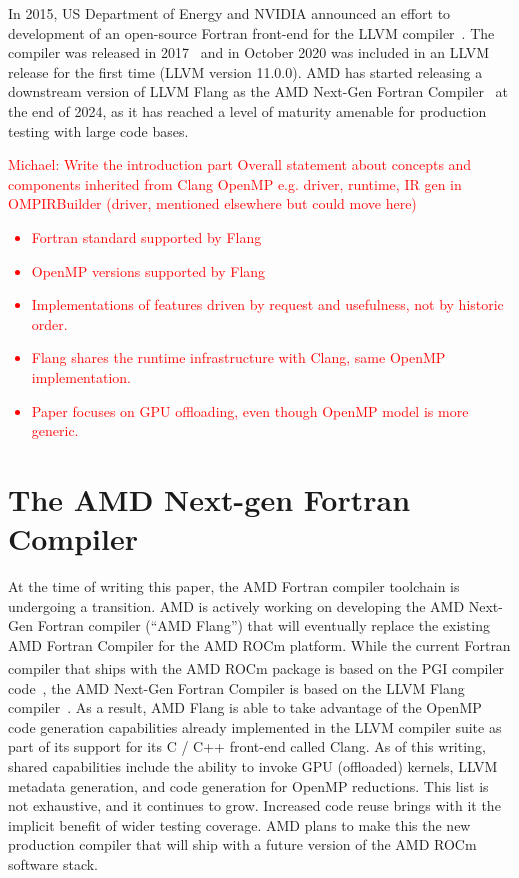 \documentclass[acmtog,natbib=false]{acmart}
\newcommand{\todo}[1]{\textcolor{red}{#1}}
\newcommand{\registered}[0]{\textsuperscript{\textregistered}\xspace}
\newcommand{\trademark}[0]{\texttrademark\xspace}
\begin{document}
In 2015, US Department of Energy and NVIDIA announced an effort to development of an open-source Fortran front-end for the LLVM compiler~\cite{Flang-Nvidia-NNSA}.
The compiler was released in 2017~\cite{Pric17} and in October 2020 was included in an LLVM release for the first time (LLVM version 11.0.0).
AMD has started releasing a downstream version of LLVM Flang as the AMD Next-Gen Fortran Compiler~\cite{AMD24} at the end of 2024, as it has reached a level of maturity amenable for production testing with large code bases.

\todo{Michael: Write the introduction part}
\todo{Overall statement about concepts and components inherited from Clang OpenMP e.g. driver, runtime, IR gen in OMPIRBuilder (driver, mentioned elsewhere but could move here)}
\todo{
\begin{itemize}
\item Fortran standard supported by Flang
\item OpenMP versions supported by Flang
\item Implementations of features driven by request and usefulness, not by historic order.
\item Flang shares the runtime infrastructure with Clang, same OpenMP implementation. 
\item Paper focuses on GPU offloading, even though OpenMP model is more generic.
\end{itemize}
}


\section{The AMD Next-gen Fortran Compiler}
\label{sec:LLVMFlangCompiler}

At the time of writing this paper, the AMD Fortran compiler toolchain is undergoing a transition.
AMD is actively working on developing the AMD Next-Gen Fortran compiler (``AMD Flang'') that will eventually replace the existing AMD Fortran Compiler for the AMD ROCm\trademark platform.
While the current Fortran compiler that ships with the AMD ROCm\trademark package is based on the PGI\registered compiler code~\cite{Lara17,Pric17}, the AMD Next-Gen Fortran Compiler is based on the LLVM Flang compiler~\cite{LLVM25}. As a result, AMD Flang is able to take advantage of the OpenMP code generation capabilities already implemented in the LLVM compiler suite as part of its support for its C / C++ front-end called Clang. As of this writing, shared capabilities include the ability to invoke GPU (offloaded) kernels, LLVM metadata generation, and code generation for OpenMP reductions. This list is not exhaustive, and it continues to grow. Increased code reuse brings with it the implicit benefit of wider testing coverage. AMD plans to make this the new production compiler that will ship with a future version of the AMD ROCm\trademark software stack.
\end{document}
